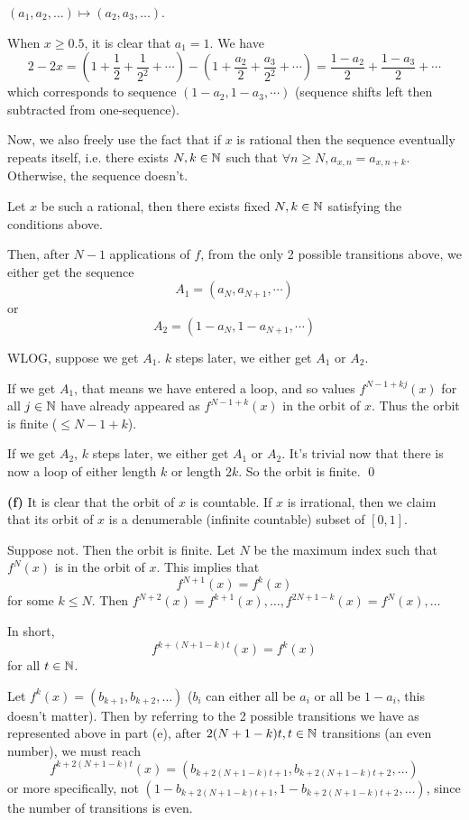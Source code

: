 \documentclass[a4paper, 12pt]{article}
\begin{document}
\begin{solution}
    $(a_1, a_2, \dots ) \mapsto (a_2, a_3, \dots)$.
    
    When $x \geq 0.5$, it is clear that $a_1 = 1$. We have \[
    2 - 2x = \left(1 + \frac{1}{2} + \frac{1}{2^2} + \cdots\right) - \left(1 + \frac{a_2}{2} + \frac{a_3}{2^2} + \cdots \right) = \frac{1-a_2}{2} + \frac{1-a_3}{2} + \cdots
    \]
    which corresponds to sequence $(1-a_2, 1-a_3, \cdots)$ (sequence shifts left then subtracted from one-sequence).

    Now, we also freely use the fact that if $x$ is rational then the sequence eventually repeats itself, i.e. there exists $N, k \in \mathbb{N}$ such that $\forall n \geq N, a_{x, n} = a_{x, n+k}$. Otherwise, the sequence doesn't.

    Let $x$ be such a rational, then there exists fixed $N, k \in \mathbb{N}$ satisfying the conditions above.

    Then, after $N-1$ applications of $f$, from the only 2 possible transitions above, we either get the sequence \[
    A_1 = (a_N, a_{N+1}, \cdots)
    \]
    or \[
    A_2 = (1 - a_N, 1 - a_{N+1}, \cdots)
    \]
    
    WLOG, suppose we get $A_1$. $k$ steps later, we either get $A_1$ or $A_2$. 
    
    If we get $A_1$, that means we have entered a loop, and so values $f^{N-1 + kj}(x)$ for all $j \in \mathbb{N}$ have already appeared as $f^{N-1 + k}(x)$ in the orbit of $x$. Thus the orbit is finite ($\leq N-1 + k$).

    If we get $A_2$, $k$ steps later, we either get $A_1$ or $A_2$. It's trivial now that there is now a loop of either length $k$ or length $2k$. So the orbit is finite. \qed

    \textbf{(f)} It is clear that the orbit of $x$ is countable. If $x$ is irrational, then we claim that its orbit of $x$ is a denumerable (infinite countable) subset of $[0, 1]$.

    Suppose not. Then the orbit is finite. Let $N$ be the maximum index such that $f^N(x)$ is in the orbit of $x$. This implies that \[
    f^{N+1}(x) = f^k(x)
    \]
    for some $k \leq N$. Then $f^{N+2}(x) = f^{k+1}(x), \dots, f^{2N+1-k}(x) = f^N(x), \dots$

    In short, 
    \begin{equation} \label{loop}
        f^{k + (N+1 - k)t}(x) = f^k(x)
    \end{equation}
    for all $t \in \mathbb{N}$.

    Let $f^k(x) = (b_{k+1}, b_{k+2}, \dots)$ ($b_i$ can either all be $a_i$ or all be $1-a_i$, this doesn't matter). Then by referring to the 2 possible transitions we have as represented above in part (e), after $2(N+1-k)t, t \in \mathbb{N}$ transitions (an even number), we must reach \[
    f^{k + 2(N+1-k)t}(x) = (b_{k + 2(N+1-k)t + 1}, b_{k + 2(N+1-k)t + 2}, \dots)
    \]
    or more specifically, not $(1 - b_{k + 2(N+1-k)t + 1}, 1 - b_{k + 2(N+1-k)t + 2}, \dots)$, since the number of transitions is even.


\end{solution}
\end{document}
